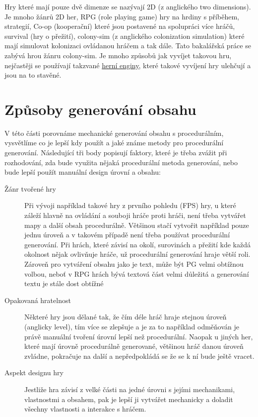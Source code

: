 Hry které mají pouze dvě dimenze se nazývají 2D (z anglického two dimensions). Je mnoho žánrů 2D her, RPG (role playing game) hry na hrdiny s příběhem, strategií, Co-op (kooperační) které jsou postavené na spolupráci více hráčů, survival (hry o přežití), colony-sim (z anglického colonization simulation) které mají simulovat kolonizaci ovládanou hráčem a tak dále. Tato bakalářská práce se zabývá hrou žánru colony-sim. Je mnoho způsobů jak vyvíjet takovou hru, nejčastěji se používají takzvané \hyperref[engines]{herní enginy}, které takové vyvíjení hry ulehčují a jsou na to stavěné.


\section{Způsoby generování obsahu}
V této části porovnáme mechanické generování obsahu s procedurálním, vysvětlíme co je lepší kdy použít a jaké známe metody pro procedurální generování. Následující tři body popisují faktory, které je třeba zvážit při rozhodování, zda bude využita nějaká procedurální metoda generování, nebo bude lepší použít manuální design úrovní a obsahu:
\begin{description}
	\item[Žánr tvořené hry] Při vývoji například takové hry z prvního pohledu (FPS) hry, u které záleží hlavně na ovládání a souboji hráče proti hráči, není třeba vytvářet mapy a další obsah procedurálně. Většinou stačí vytvořit například pouze jednu úroveň a v takovém případě není třeba používat procedurální generování. Při hrách, které závisí na okolí, surovinách a přežití kde každá okolnost nějak ovlivňuje hráče, už procedurální generování hraje větší roli. Zároveň pro vytváření obsahu jako je text, může být PG velmi obtížnou volbou, neboť v RPG hrách bývá textová část velmi důležitá a generování textu je stále dost obtížné
	\item[Opakovaná hratelnost] Některé hry jsou dělané tak, že čím déle hráč hraje stejnou úroveň (anglicky level), tím více se zlepšuje a je za to například odměňován je právě manuální tvoření úrovní lepší než procedurální. Naopak u jiných her, které mají úrovně procedurálně generované, většinou hráč danou úroveň zvládne, pokračuje na další a nepředpokládá se že se k ní bude ještě vracet.
	\item[Aspekt designu hry] Jestliže hra závisí z velké části na jedné úrovni s jejími mechanikami, vlastnostmi a obsahem, pak je lepší ji vytvářet mechanicky a doladit všechny vlastnosti a interakce s hráčem.
\end{description}


